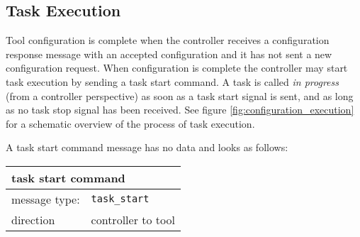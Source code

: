 \documentclass{article}
\newcommand{\msg}[1]{\texttt{#1}}
\begin{document}


  \subsection{Task Execution} \label{ss::task_execution}

   \noindent Tool configuration is complete when the controller receives a
   configuration response message with an accepted configuration and it has not
   sent a new configuration request.  When configuration is complete the
   controller may start task execution by sending a task start command. A task
   is called \textit{in progress} (from a controller perspective) as soon as a
   task start signal is sent, and as long as no task stop signal has been
   received. See figure \ref{fig:configuration_execution} for a schematic
   overview of the process of task execution.

   A task start command message has no data and looks as follows:

   \begin{table}[H]
    \begin{center}
     \begin{tabular}{|ll|}
      \hline
       \multicolumn{2}{|l|}{\textbf{task start command}} \\
      \hline
       message type:   & \msg{task\_start} \\
      \hline
       direction       & controller to tool \\
      \hline
     \end{tabular}
    \end{center}
    \vspace{-0.3cm}
   \end{table}
\end{document}
